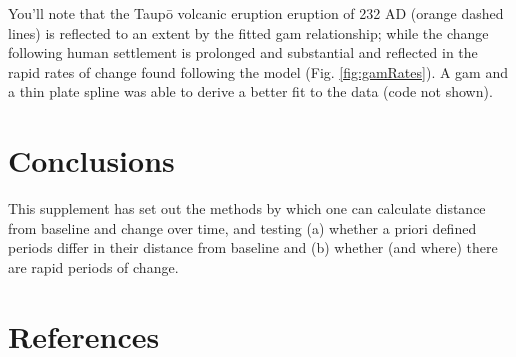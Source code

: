 \documentclass[nofonts,]{tufte-handout}
\begin{document}
You'll note that the Taupō volcanic eruption eruption of 232 AD (orange
dashed lines) is reflected to an extent by the fitted gam relationship;
while the change following human settlement is prolonged and substantial
and reflected in the rapid rates of change found following the model
(Fig. \ref{fig:gamRates}). A gam and a thin plate spline was able to
derive a better fit to the data (code not shown).

\hypertarget{conclusions}{%
\section{Conclusions}\label{conclusions}}

This supplement has set out the methods by which one can calculate
distance from baseline and change over time, and testing (a) whether a
priori defined periods differ in their distance from baseline and (b)
whether (and where) there are rapid periods of change.

\clearpage

\hypertarget{references}{%
\section*{References}\label{references}}
\end{document}

